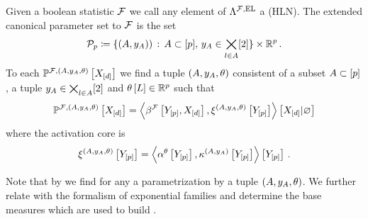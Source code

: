 \begin{definition}[\HybridLogicNetwork{}]
    \label{def:hybridLogicNetwork}
    Given a boolean statistic $\mathcal{F}$ we call any element of $\Lambda^{\mathcal{F},\mathrm{EL}}$ a \HybridLogicNetwork{} (HLN).
    The extended canonical parameter set to $\mathcal{F}$ is the set
    \begin{align*}
        \mathcal{P}_{p}\coloneqq
        \{(A,y_{A}))\,:\, A\subset[p],\, y_{A}\in\bigtimes_{l\in A}[2]\} \times \mathbb{R}^{p} \, .
    \end{align*}
    To each \HybridLogicNetwork{} $\mathbb{P}^{\mathcal{F},(A,y_{A},\theta)}\left[X_{[d]}\right]$ we find a tuple $(A,y_{A},\theta)$ consistent of a subset $A\subset[p]$, a tuple $y_{A}\in\bigtimes_{l\in A}[2]$ and $\theta\left[L\right]\in\mathbb{R}^{p}$ such that
    \begin{align*}
        \mathbb{P}^{\mathcal{F},(A,y_{A},\theta)}\left[X_{[d]}\right]
        = \left\langle \beta^{\mathcal{F}}\left[Y_{[p]},X_{[d]}\right],\xi^{(A,y_{A},\theta)}\left[Y_{[p]}\right]\right\rangle \left[ X_{[d]} | \varnothing \right]
    \end{align*}
    where the activation core is
    \begin{align*}
        \xi^{(A,y_{A},\theta)}\left[Y_{[p]}\right] = \left\langle \alpha^\theta\left[Y_{[p]}\right],\kappa^{(A,y_{A})}\left[Y_{[p]}\right]\right\rangle \left[ Y_{[p]} \right] \, .
    \end{align*}
\end{definition}

Note that by  we find for any \HybridLogicNetwork{} a parametrization by a tuple $(A,y_{A},\theta)$.
We further relate with the formalism of exponential families and determine the base measures which are used to build \HybridLogicNetworks{}.

